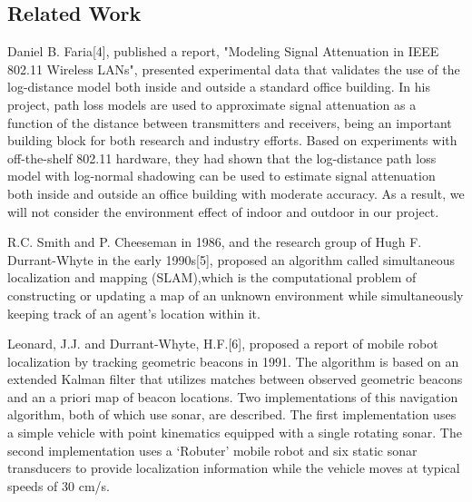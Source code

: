\subsection{Related Work}
Daniel B. Faria[4], published a report, "Modeling Signal Attenuation in IEEE 802.11 Wireless LANs", presented experimental data that validates the use of the log-distance model both inside and outside a standard office building. In his project, path loss models are used to approximate signal attenuation as a function of the distance between transmitters and receivers, being an important building block for both research and industry efforts. Based on experiments with off-the-shelf 802.11 hardware, they had shown that the log-distance path loss model with log-normal shadowing can be used to estimate signal attenuation both inside and outside an office building with moderate accuracy. As a result, we will not consider the environment effect of indoor and outdoor in our project.
\par
R.C. Smith and P. Cheeseman in 1986, and the research group of Hugh F. Durrant-Whyte in the early 1990s[5], proposed an algorithm called simultaneous localization and mapping (SLAM),which is the computational problem of constructing or updating a map of an unknown environment while simultaneously keeping track of an agent's location within it. 
\par
Leonard, J.J. and Durrant-Whyte, H.F.[6], proposed a report of mobile robot localization by tracking geometric beacons in 1991. The algorithm is based on an extended Kalman filter that utilizes matches between observed geometric beacons and an a priori map of beacon locations. Two implementations of this navigation algorithm, both of which use sonar, are described. The first implementation uses a simple vehicle with point kinematics equipped with a single rotating sonar. The second implementation uses a `Robuter' mobile robot and six static sonar transducers to provide localization information while the vehicle moves at typical speeds of 30 cm/s.

